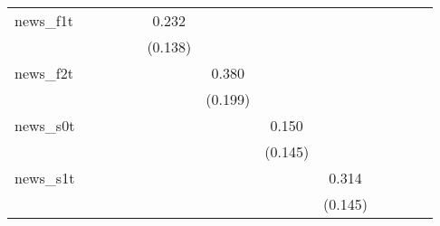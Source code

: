 {\begin{tabular}{l*{12}{c}}
\addlinespace
news\_f1t    &                     &                     &                     &                     &       0.232\sym{*}  &                     &                     &                     &                     &                     &                     &                     \\
            &                     &                     &                     &                     &     (0.138)         &                     &                     &                     &                     &                     &                     &                     \\
\addlinespace
news\_f2t    &                     &                     &                     &                     &                     &       0.380\sym{*}  &                     &                     &                     &                     &                     &                     \\
            &                     &                     &                     &                     &                     &     (0.199)         &                     &                     &                     &                     &                     &                     \\
\addlinespace
news\_s0t    &                     &                     &                     &                     &                     &                     &       0.150         &                     &                     &                     &                     &                     \\
            &                     &                     &                     &                     &                     &                     &     (0.145)         &                     &                     &                     &                     &                     \\
\addlinespace
news\_s1t    &                     &                     &                     &                     &                     &                     &                     &       0.314\sym{**} &                     &                     &                     &                     \\
            &                     &                     &                     &                     &                     &                     &                     &     (0.145)         &                     &                     &                     &                     \\

\end{tabular}}
